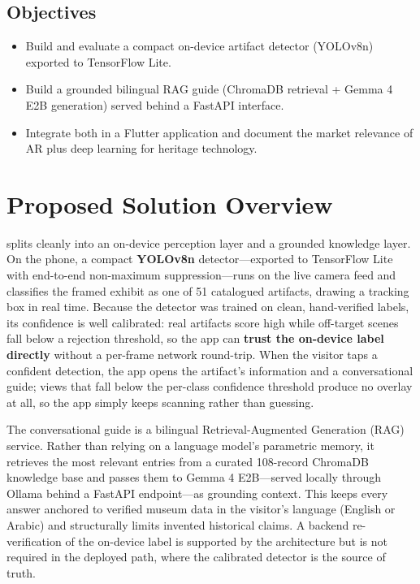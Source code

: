 \subsection{Objectives}
\begin{itemize}[leftmargin=1.5em]
  \item Build and evaluate a compact on-device artifact detector
        (YOLOv8n) exported to TensorFlow Lite.
  \item Build a grounded bilingual RAG guide (ChromaDB retrieval + Gemma 4 E2B
        generation) served behind a FastAPI interface.
  \item Integrate both in a Flutter application and document the market relevance of
        AR plus deep learning for heritage technology.
\end{itemize}

\section{Proposed Solution Overview}

\TimeLens{} splits cleanly into an on-device perception layer and a grounded
knowledge layer. On the phone, a compact \textbf{YOLOv8n} detector---exported to
TensorFlow Lite with end-to-end non-maximum suppression---runs on the live camera
feed and classifies the framed exhibit as one of 51 catalogued artifacts, drawing a
tracking box in real time. Because the detector was trained on clean, hand-verified
labels, its confidence is well calibrated: real artifacts score high while off-target
scenes fall below a rejection threshold, so the app can \textbf{trust the on-device
label directly} without a per-frame network round-trip. When the visitor taps a
confident detection, the app opens the artifact's information and a conversational
guide; views that fall below the per-class confidence threshold produce no overlay at
all, so the app simply keeps scanning rather than guessing.

The conversational guide is a bilingual Retrieval-Augmented Generation (RAG)
service. Rather than relying on a language model's parametric memory, it retrieves
the most relevant entries from a curated 108-record ChromaDB knowledge base and
passes them to Gemma 4 E2B---served locally through Ollama behind a FastAPI
endpoint---as grounding context. This keeps every answer anchored to verified museum
data in the visitor's language (English or Arabic) and structurally limits invented
historical claims. A backend re-verification of the on-device label is supported by
the architecture but is not required in the deployed path, where the calibrated
detector is the source of truth.

